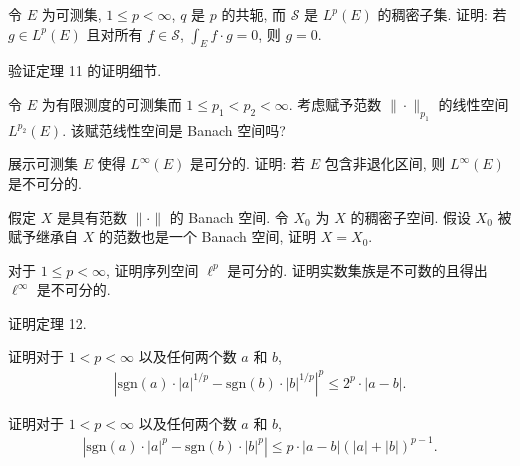 \documentclass[../../main.tex]{subfiles}
\begin{document}
\begin{exercise}\label{exercise:ch07-39}
令 $E$ 为可测集, $1\leqslant p<\infty$, $q$ 是 $p$ 的共轭, 而 $\mathcal{S}$ 是 $L^{p}(E)$ 的稠密子集. 证明: 若 $g\in L^{p}(E)$ 且对所有 $f\in\mathcal{S}$, $\int_{E}f\cdot g=0$, 则 $g=0$.
\end{exercise}

\begin{exercise}\label{exercise:ch07-40}
验证定理 11 的证明细节.
\end{exercise}

\begin{exercise}\label{exercise:ch07-41}
令 $E$ 为有限测度的可测集而 $1\leqslant p_{1}<p_{2}<\infty$. 考虑赋予范数 $\|\cdot\|_{p_{1}}$ 的线性空间 $L^{p_{2}}(E)$. 该赋范线性空间是 Banach 空间吗?
\end{exercise}

\begin{exercise}\label{exercise:ch07-42}
展示可测集 $E$ 使得 $L^{\infty}(E)$ 是可分的. 证明: 若 $E$ 包含非退化区间, 则 $L^{\infty}(E)$ 是不可分的.
\end{exercise}

\begin{exercise}\label{exercise:ch07-43}
假定 $X$ 是具有范数 $\|\cdot\|$ 的 Banach 空间. 令 $X_{0}$ 为 $X$ 的稠密子空间. 假设 $X_{0}$ 被赋予继承自 $X$ 的范数也是一个 Banach 空间, 证明 $X=X_{0}$.
\end{exercise}

\begin{exercise}\label{exercise:ch07-44}
对于 $1\leqslant p<\infty$, 证明序列空间 $\ell^{p}$ 是可分的. 证明实数集族是不可数的且得出 $\ell^{\infty}$ 是不可分的.
\end{exercise}

\begin{exercise}\label{exercise:ch07-45}
证明定理 12.
\end{exercise}

\begin{exercise}\label{exercise:ch07-46}
证明对于 $1<p<\infty$ 以及任何两个数 $a$ 和 $b$,
\begin{align*}
\left|\mathrm{sgn}(a)\cdot|a|^{1/p}-\mathrm{sgn}(b)\cdot|b|^{1/p}\right|^{p}\leqslant 2^{p}\cdot|a-b|.
\end{align*}
\end{exercise}

\begin{exercise}\label{exercise:ch07-47}
证明对于 $1<p<\infty$ 以及任何两个数 $a$ 和 $b$,
\begin{align*}
\left|\mathrm{sgn}(a)\cdot|a|^{p}-\mathrm{sgn}(b)\cdot|b|^{p}\right|\leqslant p\cdot|a-b|(|a|+|b|)^{p-1}.
\end{align*}
\end{exercise}
\end{document}
